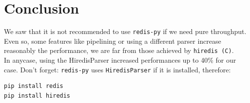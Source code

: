 \documentclass[a4paper, 11pt]{report}
\begin{document}
\chapter*{Conclusion}
We saw that it is not recommended to use \texttt{redis-py} if we need pure throughput. Even so, some features like pipelining or using a different parser increase reasonably the performance, we are far from those achieved by \texttt{hiredis (C)}.\\

In anycase, using the HiredisParser increased performances up to 40\% for our case. Don't forget: \texttt{redis-py} uses \texttt{HiredisParser} if it is installed, therefore:\\


\begin{minipage}{0.3\linewidth}
\begin{lstlisting}
pip install redis
pip install hiredis
\end{lstlisting}
\end{minipage}
\end{document}
